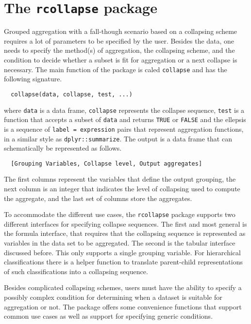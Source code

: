 \documentclass[11pt, fleqn]{article}
\begin{document}
\section{The \texttt{rcollapse} package}
Grouped aggregation with a fall-though scenario based on a collapsing scheme
requires a lot of parameters to be specified by the user. Besides the data, one
needs to specify the method(s) of aggregation, the collapsing scheme, and the
condition to decide whether a subset is fit for aggregation or a next collapse
is necessary. The main function of the package is caled \texttt{collapse}
and has the following signature.
\begin{verbatim}
  collapse(data, collapse, test, ...)
\end{verbatim}
where \texttt{data} is a data frame, \texttt{collapse} represents the collapse
sequence, \texttt{test} is a function that accepts a subset of \texttt{data}
and returns \texttt{TRUE} or \texttt{FALSE} and the ellepsis is a sequence
of \texttt{label = expression} pairs that represent aggregation
functions, in a similar style as \texttt{dplyr::summarize}. The output
is a data frame that can schematically be represented as follows.
\begin{verbatim}
  [Grouping Variables, Collapse level, Output aggregates]
\end{verbatim}
The first columns represent the variables that define the output grouping, the
next column is an integer that indicates the level of collapsing used to
compute the aggregate, and the last set of columns store the aggregates.

To accommodate the different use cases, the \texttt{rcollapse} package supports
two different interfaces for specifying collapse sequences.  The first and most
general is the formula interface, that requires that the collapsing sequence is
represented as variables in the data set to be aggregated. The second is the
tabular interface discussed before. This only supports a single grouping
variable. For hierarchical classifications there is a helper function to
translate parent-child representations of such classifications into a
collapsing sequence.

Besides complicated collapsing schemes, users must have the ability to specify
a possibly complex condition for determining when a dataset is suitable for
aggregation or not. The package offers some convenience functions that support common
use cases as well as support for specifying generic conditions.

\end{document}
